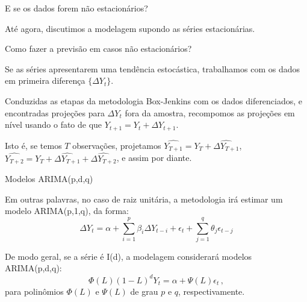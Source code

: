 \documentclass[11pt]{beamer}
\newenvironment{halfwideitemize}{\itemize\addtolength{\itemsep}{0.5em}}{\enditemize}
\begin{document}
\begin{frame}{E se os dados forem não estacionários?}
	\begin{halfwideitemize}
		\item Até agora, discutimos a modelagem supondo as séries estacionárias.
		\begin{halfwideitemize}
			\item Como fazer a previsão em casos não estacionários?
		\end{halfwideitemize}
		\item Se as séries apresentarem uma tendência estocástica, trabalhamos com os dados em primeira diferença $\{\Delta Y_t\}$. 
		
		\item Conduzidas as etapas da metodologia Box-Jenkins com os dados diferenciados, e encontradas projeções para $\Delta Y_t$ fora da amostra, recompomos as projeções  em nível usando o fato de que $Y_{t+1} = Y_t + \Delta Y_{t+1}$.
		\begin{halfwideitemize}
			\item Isto é, se temos $T$ observações, projetamos $\widehat{Y_{T+1}} = Y_T + \widehat{{\Delta Y_{T+1}}}$,  $\widehat{Y_{T+2}} = Y_T + \widehat{\Delta Y_{T+1}} + \widehat{\Delta Y_{T+2}}$, e assim por diante.
		\end{halfwideitemize}
		\end{halfwideitemize}
\end{frame}
\begin{frame}{Modelos ARIMA(p,d,q)}
	\begin{halfwideitemize}
				\item Em outras palavras, no caso de raiz unitária, a metodologia irá estimar um modelo {\color{blue}ARIMA(p,1,q)}, da forma:
		\begin{equation*}
			\Delta Y_t =\alpha + \sum_{i=1}^p \beta_i \Delta Y_{t-i} + \epsilon_t + \sum_{j=1}^q \theta_j \epsilon_{t-j}
		\end{equation*}
		\item De modo geral, se a série é I(d), a modelagem considerará modelos {\color{blue}ARIMA(p,d,q)}:
		$$\Phi(L)(1-L)^d Y_t =  \alpha + \Psi(L)\epsilon_t \, ,$$
		para polinômios $\Phi(L)$ e $\Psi(L)$ de grau $p$ e $q$, respectivamente.

	\end{halfwideitemize}
\end{frame}
\end{document}
